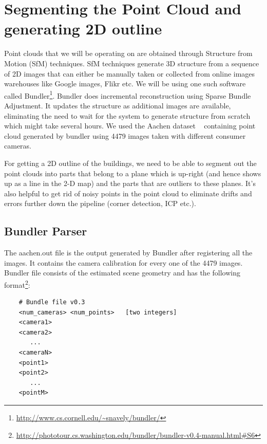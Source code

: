 \documentclass[10pt,twocolumn,letterpaper]{article}
\begin{document}

\section{Segmenting the Point Cloud and generating 2D outline}

Point clouds that we will be operating on are obtained through Structure from Motion (SfM) techniques. SfM techniques generate 3D structure from a sequence of 2D images that can either be manually taken or collected from online images warehouses like Google images, Flikr etc. We will be using one such software called Bundler\footnote{\url{http://www.cs.cornell.edu/~snavely/bundler/}}. Bundler does incremental reconstruction using Sparse Bundle Adjustment. It updates the structure as additional images are available, eliminating the need to wait for the system to generate structure from scratch which might take several hours. We used the Aachen dataset ~\cite{sattler2012image} containing point cloud generated by bundler using 4479 images taken with different consumer cameras.

For getting a 2D outline of the buildings, we need to be able to segment out the point clouds into parts that belong to a plane which is up-right (and hence shows up as a line in the 2-D map) and the parts that are outliers to these planes. It's also helpful to get rid of noisy points in the point cloud to eliminate drifts and errors further down the pipeline (corner detection, ICP etc.). 

\subsection{Bundler Parser}
The aachen.out file is the output generated by Bundler after registering all the images. It contains the camera calibration for every one of the 4479 images. Bundler file consists of the estimated scene geometry and has the following format\footnote{\url{http://phototour.cs.washington.edu/bundler/bundler-v0.4-manual.html\#S6}}:

{\scriptsize
\begin{verbatim}
    # Bundle file v0.3
    <num_cameras> <num_points>   [two integers]
    <camera1>
    <camera2>
       ...
    <cameraN>
    <point1>
    <point2>
       ...
    <pointM>
\end{verbatim}
}
\end{document}
